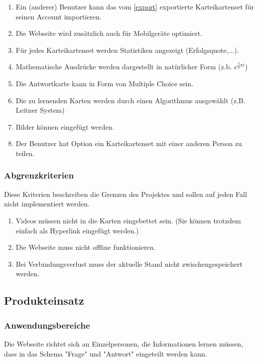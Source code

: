 \begin{enumerate}[leftmargin=2cm, label=\bfseries /WK\arabic*0/]
\item Ein (anderer) Benutzer kann das vom \ref{export} exportierte Karteikartenset für seinen Account importieren.
	\item Die Webseite wird zusätzlich auch für Mobilgeräte optimiert.
	\item Für jedes Karteikartenset werden Statistiken angezeigt (Erfolgsquote,...).
	\item Mathematische Ausdrücke werden dargestellt in natürlicher Form (z.b. \( e^{\frac{3}{4}\pi i}\))
	\item Die Antwortkarte kann in Form von Multiple Choice sein.
	\item Die zu lernenden Karten werden durch einen Algorithmus ausgewählt (z.B. Leitner System)
	\item Bilder können eingefügt werden.
	\item\label{share} Der Benutzer hat Option ein Karteikartenset mit einer anderen Person zu teilen.
\end{enumerate}

\subsubsection{Abgrenzkriterien}
Diese Kriterien beschreiben die Grenzen des Projektes und sollen auf jeden Fall nicht implementiert werden.

\begin{enumerate}[leftmargin=2cm, label=\bfseries /AK\arabic*0/]
	\item Videos müssen nicht in die Karten eingebettet sein. (Sie können trotzdem einfach als Hyperlink eingefügt werden.)
	\item Die Webseite muss nicht offline funktionieren.
	\item Bei Verbindungsverlust muss der aktuelle Stand nicht zwischengespeichert werden.
\end{enumerate}



\newpage
\subsection{Produkteinsatz}

\subsubsection{Anwendungsbereiche}
Die Webseite richtet sich an Einzelpersonen, die Informationen lernen müssen, dass in das Schema "Frage" und "Antwort" eingeteilt werden kann.

